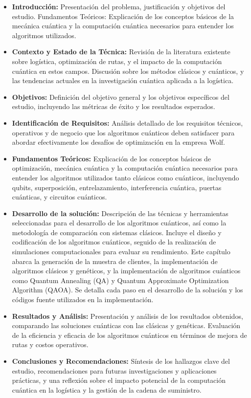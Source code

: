 \documentclass[11pt,a4paper,spanish]{book}
\begin{document}
    \begin{itemize}
    \item \textbf{Introducción:} Presentación del problema, justificación y objetivos del estudio.
    Fundamentos Teóricos: Explicación de los conceptos básicos de la mecánica cuántica y la computación cuántica necesarios para entender los algoritmos utilizados.
	
	\item \textbf{Contexto y Estado de la Técnica:} Revisión de la literatura existente sobre logística, optimización de rutas, y el impacto de la computación cuántica en estos campos. Discusión sobre los métodos clásicos y cuánticos, y las tendencias actuales en la investigación cuántica aplicada a la logística.
	
	\item \textbf{Objetivos:} Definición del objetivo general y los objetivos específicos del estudio, incluyendo las métricas de éxito y los resultados esperados.
	
	\item \textbf{Identificación de Requisitos:} Análisis detallado de los requisitos técnicos, operativos y de negocio que los algoritmos cuánticos deben satisfacer para abordar efectivamente los desafíos de optimización en la empresa Wolf.
	
	\item \textbf{Fundamentos Teóricos:} Explicación de los conceptos básicos de optimización, mecánica cuántica y la computación cuántica necesarios para entender los algoritmos utilizados tanto clásicos como cuánticos, incluyendo qubits, superposición, entrelazamiento, interferencia cuántica, puertas cuánticas, y circuitos cuánticos.
	
	\item \textbf{Desarrollo de la solución:} Descripción de las técnicas y herramientas seleccionadas para el desarrollo de los algoritmos cuánticos, así como la metodología de comparación con sistemas clásicos. Incluye el diseño y codificación de los algoritmos cuánticos, seguido de la realización de simulaciones computacionales para evaluar su rendimiento. Este capítulo abarca la generación de la muestra de clientes, la implementación de algoritmos clásicos y genéticos, y la implementación de algoritmos cuánticos como Quantum Annealing (QA) y Quantum Approximate Optimization Algorithm (QAOA). Se detalla cada paso en el desarrollo de la solución y los códigos fuente utilizados en la implementación.
		
	\item \textbf{Resultados y Análisis:} Presentación y análisis de los resultados obtenidos, comparando las soluciones cuánticas con las clásicas y genéticas. Evaluación de la eficiencia y eficacia de los algoritmos cuánticos en términos de mejora de rutas y costos operativos.
	
	\item \textbf{Conclusiones y Recomendaciones:} Síntesis de los hallazgos clave del estudio, recomendaciones para futuras investigaciones y aplicaciones prácticas, y una reflexión sobre el impacto potencial de la computación cuántica en la logística y la gestión de la cadena de suministro.
	
\end{itemize}
\end{document}

